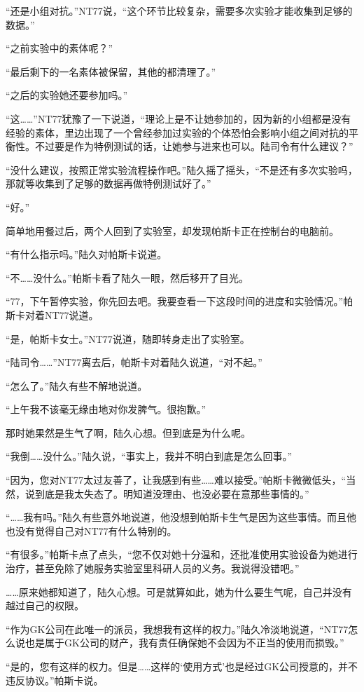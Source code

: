 “还是小组对抗。”NT77说，“这个环节比较复杂，需要多次实验才能收集到足够的数据。”

“之前实验中的素体呢？”

“最后剩下的一名素体被保留，其他的都清理了。”

“之后的实验她还要参加吗。”

“这……”NT77犹豫了一下说道，“理论上是不让她参加的，因为新的小组都是没有经验的素体，里边出现了一个曾经参加过实验的个体恐怕会影响小组之间对抗的平衡性。不过要是作为特例测试的话，让她参与进来也可以。陆司令有什么建议？”

“没什么建议，按照正常实验流程操作吧。”陆久摇了摇头，“不是还有多次实验吗，那就等收集到了足够的数据再做特例测试好了。”

“好。”

简单地用餐过后，两个人回到了实验室，却发现帕斯卡正在控制台的电脑前。

“有什么指示吗。”陆久对帕斯卡说道。

“不……没什么。”帕斯卡看了陆久一眼，然后移开了目光。

“77，下午暂停实验，你先回去吧。我要查看一下这段时间的进度和实验情况。”帕斯卡对着NT77说道。

“是，帕斯卡女士。”NT77说道，随即转身走出了实验室。

“陆司令……”NT77离去后，帕斯卡对着陆久说道，“对不起。”

“怎么了。”陆久有些不解地说道。

“上午我不该毫无缘由地对你发脾气。很抱歉。”

那时她果然是生气了啊，陆久心想。但到底是为什么呢。

“我倒……没什么。”陆久说，“事实上，我并不明白到底是怎么回事。”

“因为，您对NT77太过友善了，让我感到有些……难以接受。”帕斯卡微微低头，“当然，说到底是我太失态了。明知道没理由、也没必要在意那些事情的。”

“……我有吗。”陆久有些意外地说道，他没想到帕斯卡生气是因为这些事情。而且他也没有觉得自己对NT77有什么特别的。

“有很多。”帕斯卡点了点头，“您不仅对她十分温和，还批准使用实验设备为她进行治疗，甚至免除了她服务实验室里科研人员的义务。我说得没错吧。”

……原来她都知道了，陆久心想。可是就算如此，她为什么要生气呢，自己并没有越过自己的权限。

“作为GK公司在此唯一的派员，我想我有这样的权力。”陆久冷淡地说道，“NT77怎么说也是属于GK公司的财产，我有责任确保她不会因为不正当的使用而损毁。”

“是的，您有这样的权力。但是……这样的‘使用方式’也是经过GK公司授意的，并不违反协议。”帕斯卡说。

